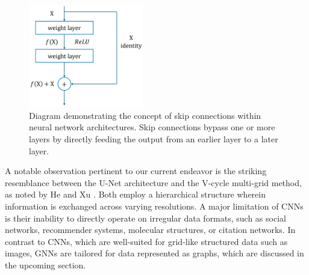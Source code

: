 \begin{figure}[ht]
    \centering
    \includegraphics[width=5cm]{images/Theory-DL/Skip.png}
    \caption{Diagram demonstrating the concept of skip connections within neural network architectures. Skip connections bypass one or more layers by directly feeding the output from an earlier layer to a later layer.} 
    \label{fig:Skip}
\end{figure}
A notable observation pertinent to our current endeavor is the striking resemblance between the U-Net architecture and the V-cycle multi-grid method, as noted by He and Xu \cite{HeXu2019}. Both employ a hierarchical structure wherein information is exchanged across varying resolutions.
A major limitation of CNNs is their inability to directly operate on irregular data formats, such as social networks, recommender systems, molecular structures, or citation networks. In contrast to CNNs, which are well-suited for grid-like structured data such as images, GNNs are tailored for data represented as graphs, which are discussed in the upcoming section.
